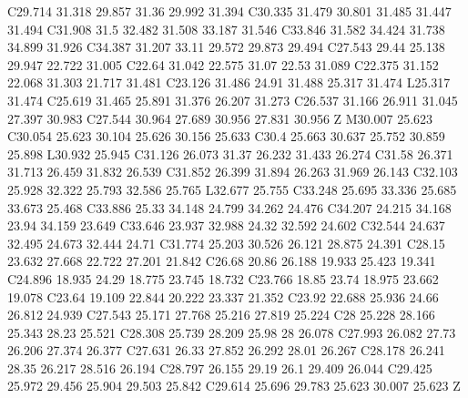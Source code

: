 {\begin{scope}[cm={0.569055,0,0,-0.569055,(-0.5cm,0.5cm)}]
{      C29.714 31.318 29.857 31.36 29.992 31.394 C30.335 31.479 30.801 31.485 31.447 31.494
      C31.908 31.5 32.482 31.508 33.187 31.546 C33.846 31.582 34.424 31.738 34.899 31.926
      C34.387 31.207 33.11 29.572 29.873 29.494 C27.543 29.44 25.138 29.947 22.722 31.005
      C22.64 31.042 22.575 31.07 22.53 31.089 C22.375 31.152 22.068 31.303 21.717 31.481
      C23.126 31.486 24.91 31.488 25.317 31.474 L25.317 31.474
      C25.619 31.465 25.891 31.376 26.207 31.273 C26.537 31.166 26.911 31.045 27.397 30.983
      C27.544 30.964 27.689 30.956 27.831 30.956 Z M30.007 25.623
      C30.054 25.623 30.104 25.626 30.156 25.633 C30.4 25.663 30.637 25.752 30.859 25.898
      L30.932 25.945 C31.126 26.073 31.37 26.232 31.433 26.274
      C31.58 26.371 31.713 26.459 31.832 26.539 C31.852 26.399 31.894 26.263 31.969 26.143
      C32.103 25.928 32.322 25.793 32.586 25.765 L32.677 25.755
      C33.248 25.695 33.336 25.685 33.673 25.468 C33.886 25.33 34.148 24.799 34.262 24.476
      C34.207 24.215 34.168 23.94 34.159 23.649 C33.646 23.937 32.988 24.32 32.592 24.602
      C32.544 24.637 32.495 24.673 32.444 24.71 C31.774 25.203 30.526 26.121 28.875 24.391
      C28.15 23.632 27.668 22.722 27.201 21.842 C26.68 20.86 26.188 19.933 25.423 19.341
      C24.896 18.935 24.29 18.775 23.745 18.732 C23.766 18.85 23.74 18.975 23.662 19.078
      C23.64 19.109 22.844 20.222 23.337 21.352 C23.92 22.688 25.936 24.66 26.812 24.939
      C27.543 25.171 27.768 25.216 27.819 25.224 C28 25.228 28.166 25.343 28.23 25.521
      C28.308 25.739 28.209 25.98 28 26.078 C27.993 26.082 27.73 26.206 27.374 26.377
      C27.631 26.33 27.852 26.292 28.01 26.267 C28.178 26.241 28.35 26.217 28.516 26.194
      C28.797 26.155 29.19 26.1 29.409 26.044 C29.425 25.972 29.456 25.904 29.503 25.842
      C29.614 25.696 29.783 25.623 30.007 25.623 Z
    }
  \end{scope}
}

\newcommand{\IconoCorazon}[1]{%
  \begin{scope}[cm={0.569055,0,0,-0.569055,(-0.5cm,0.5cm)}]
    \SVGStroke{#1}{0.7pt}{
      M32.708 8.333 C39.313 8.333 43.75 14.542 43.75 20.333
      C43.75 32.062 25.333 41.667 25 41.667 C24.667 41.667 6.25 32.062 6.25 20.333
      C6.25 14.542 10.688 8.333 17.292 8.333 C21.083 8.333 23.563 10.229 25 11.896
      C26.438 10.229 28.917 8.333 32.708 8.333 Z
    }
  \end{scope}
}

\newcommand{\IconoVarita}[1]{%
  \begin{scope}[cm={0.569055,0,0,-0.569055,(-0.5cm,0.5cm)}]
    \SVGStroke{#1}{0.65pt}{
      M31.25 18.75 L27.083 18.75 M28.378 9.122 L23.958 13.542 M18.75 10.417 L18.75 6.25
      M13.542 13.542 L9.122 9.122 M10.417 18.75 L6.25 18.75 M13.542 23.958 L9.122 28.378
      M18.75 31.25 L18.75 27.083 M41.667 41.667 L25 25
    }
  \end{scope}
}

